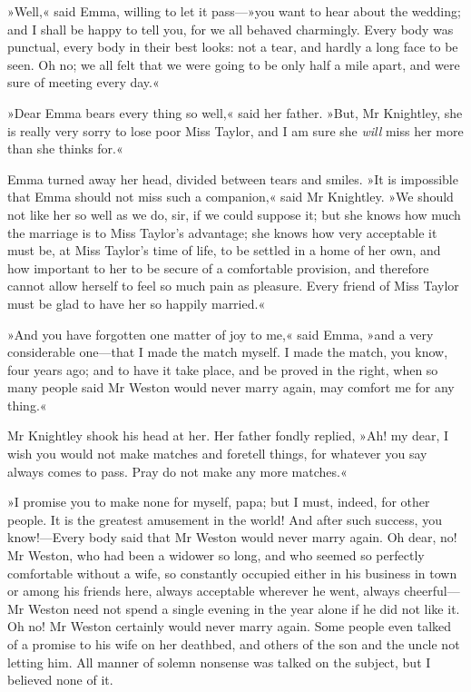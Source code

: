 »Well,« said Emma, willing to let it pass—»you want to hear about the wedding; and I shall be happy to tell you, for we all behaved charmingly. Every body was punctual, every body in their best looks: not a tear, and hardly a long face to be seen. Oh no; we all felt that we were going to be only half a mile apart, and were sure of meeting every day.«

»Dear Emma bears every thing so well,« said her father. »But, Mr Knightley, she is really very sorry to lose poor Miss Taylor, and I am sure she \textit{will} miss her more than she thinks for.«

Emma turned away her head, divided between tears and smiles. »It is impossible that Emma should not miss such a companion,« said Mr Knightley. »We should not like her so well as we do, sir, if we could suppose it; but she knows how much the marriage is to Miss Taylor's advantage; she knows how very acceptable it must be, at Miss Taylor's time of life, to be settled in a home of her own, and how important to her to be secure of a comfortable provision, and therefore cannot allow herself to feel so much pain as pleasure. Every friend of Miss Taylor must be glad to have her so happily married.«

»And you have forgotten one matter of joy to me,« said Emma, »and a very considerable one—that I made the match myself. I made the match, you know, four years ago; and to have it take place, and be proved in the right, when so many people said Mr Weston would never marry again, may comfort me for any thing.«

Mr Knightley shook his head at her. Her father fondly replied, »Ah! my dear, I wish you would not make matches and foretell things, for whatever you say always comes to pass. Pray do not make any more matches.«

»I promise you to make none for myself, papa; but I must, indeed, for other people. It is the greatest amusement in the world! And after such success, you know!—Every body said that Mr Weston would never marry again. Oh dear, no! Mr Weston, who had been a widower so long, and who seemed so perfectly comfortable without a wife, so constantly occupied either in his business in town or among his friends here, always acceptable wherever he went, always cheerful—Mr Weston need not spend a single evening in the year alone if he did not like it. Oh no! Mr Weston certainly would never marry again. Some people even talked of a promise to his wife on her deathbed, and others of the son and the uncle not letting him. All manner of solemn nonsense was talked on the subject, but I believed none of it.

